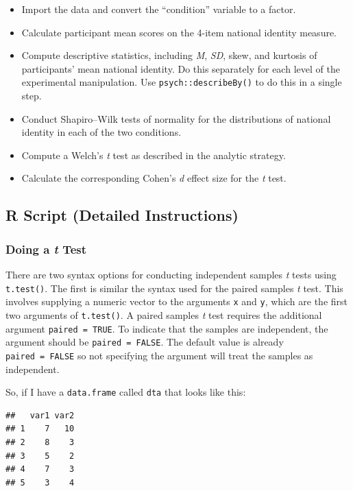 \documentclass[
]{book}
\providecommand{\tightlist}{%
  \setlength{\itemsep}{0pt}\setlength{\parskip}{0pt}}
\begin{document}
\begin{itemize}
\tightlist
\item
  Import the data and convert the ``condition'' variable to a factor.
\item
  Calculate participant mean scores on the 4-item national identity measure.
\item
  Compute descriptive statistics, including \emph{M}, \emph{SD}, skew, and kurtosis of participants' mean national identity. Do this separately for each level of the experimental manipulation. Use \texttt{psych::describeBy()} to do this in a single step.
\item
  Conduct Shapiro--Wilk tests of normality for the distributions of national identity in each of the two conditions.
\item
  Compute a Welch's \emph{t} test as described in the analytic strategy.
\item
  Calculate the corresponding Cohen's \emph{d} effect size for the \emph{t} test.
\end{itemize}

\hypertarget{r-script-detailed-instructions}{%
\subsection{R Script (Detailed Instructions)}\label{r-script-detailed-instructions}}

\hypertarget{doing-a-t-test}{%
\subsubsection{\texorpdfstring{Doing a \emph{t} Test}{Doing a t Test}}\label{doing-a-t-test}}

There are two syntax options for conducting independent samples \emph{t} tests using \texttt{t.test()}. The first is similar the syntax used for the paired samples \emph{t} test. This involves supplying a numeric vector to the arguments \texttt{x} and \texttt{y}, which are the first two arguments of \texttt{t.test()}. A paired samples \emph{t} test requires the additional argument \texttt{paired\ =\ TRUE}. To indicate that the samples are independent, the argument should be \texttt{paired\ =\ FALSE}. The default value is already \texttt{paired\ =\ FALSE} so not specifying the argument will treat the samples as independent.

So, if I have a \texttt{data.frame} called \texttt{dta} that looks like this:

\begin{verbatim}
##   var1 var2
## 1    7   10
## 2    8    3
## 3    5    2
## 4    7    3
## 5    3    4
\end{verbatim}
\end{document}
